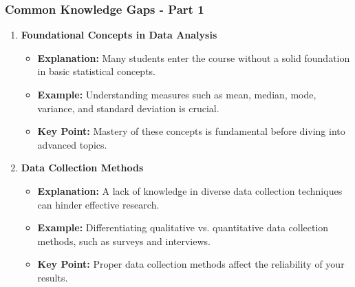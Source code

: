 \documentclass[aspectratio=169]{beamer}
\begin{document}
\begin{frame}[fragile]
    \frametitle{Common Knowledge Gaps - Part 1}
    \begin{enumerate}
        \item \textbf{Foundational Concepts in Data Analysis}
            \begin{itemize}
                \item \textbf{Explanation:} Many students enter the course without a solid foundation in basic statistical concepts.
                \item \textbf{Example:} Understanding measures such as mean, median, mode, variance, and standard deviation is crucial.
                \item \textbf{Key Point:} Mastery of these concepts is fundamental before diving into advanced topics.
            \end{itemize}

        \item \textbf{Data Collection Methods}
            \begin{itemize}
                \item \textbf{Explanation:} A lack of knowledge in diverse data collection techniques can hinder effective research.
                \item \textbf{Example:} Differentiating qualitative vs. quantitative data collection methods, such as surveys and interviews.
                \item \textbf{Key Point:} Proper data collection methods affect the reliability of your results.
            \end{itemize}
    \end{enumerate}
\end{frame}
\end{document}
